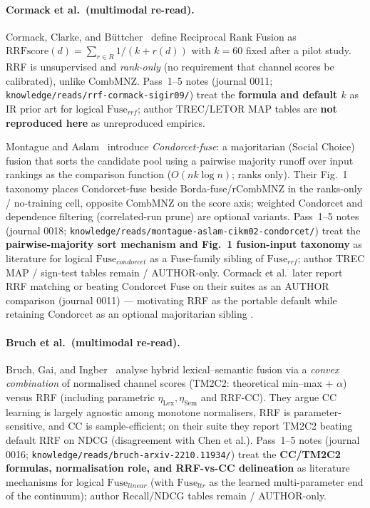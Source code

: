 \paragraph{Cormack et al.\ (multimodal re-read).}
Cormack, Clarke, and B\"{u}ttcher~\citep{cormack2009rrf} define Reciprocal Rank Fusion as
\(\mathrm{RRFscore}(d)=\sum_{r\in R} 1/(k+r(d))\) with \(k=60\) fixed after a pilot study.
RRF is unsupervised and \emph{rank-only} (no requirement that channel scores be calibrated), unlike CombMNZ.
Pass~1--5 notes (journal 0011; \texttt{knowledge/reads/rrf-cormack-sigir09/}) treat the \textbf{formula and default \(k\)} as \established{} IR prior art for logical \(\mathrm{Fuse}_{rrf}\); author TREC/LETOR MAP tables are \textbf{not reproduced here} \provisional{} as unreproduced empirics.

Montague and Aslam~\citep{montague2002condorcet} introduce \emph{Condorcet-fuse}: a majoritarian (Social Choice) fusion that sorts the candidate pool using a pairwise majority runoff over input rankings as the comparison function (\(O(nk\log n)\); ranks only).
Their Fig.~1 taxonomy places Condorcet-fuse beside Borda-fuse/rCombMNZ in the ranks-only / no-training cell, opposite CombMNZ on the score axis; weighted Condorcet and dependence filtering (correlated-run prune) are optional variants.
Pass~1--5 notes (journal 0018; \texttt{knowledge/reads/montague-aslam-cikm02-condorcet/}) treat the \textbf{pairwise-majority sort mechanism and Fig.~1 fusion-input taxonomy} as \established{} literature for logical \(\mathrm{Fuse}_{condorcet}\) as a Fuse-family sibling of \(\mathrm{Fuse}_{rrf}\); author TREC MAP / sign-test tables remain \provisional{} / AUTHOR-only.
Cormack et al.\ later report RRF matching or beating Condorcet Fuse on their suites \established{} as an AUTHOR comparison (journal 0011) --- motivating RRF as the portable default while retaining Condorcet as an optional majoritarian sibling \hypothesis{}.

\paragraph{Bruch et al.\ (multimodal re-read).}
Bruch, Gai, and Ingber~\citep{bruch2023fusion} analyse hybrid lexical--semantic fusion via a \emph{convex combination} of normalised channel scores (TM2C2: theoretical min--max + \(\alpha\)) versus RRF (including parametric \(\eta_{\mathrm{Lex}},\eta_{\mathrm{Sem}}\) and RRF-CC).
They argue CC learning is largely agnostic among monotone normalisers, RRF is parameter-sensitive, and CC is sample-efficient; on their suite they report TM2C2 beating default RRF on NDCG (disagreement with Chen et al.).
Pass~1--5 notes (journal 0016; \texttt{knowledge/reads/bruch-arxiv-2210.11934/}) treat the \textbf{CC/TM2C2 formulas, normalisation role, and RRF-vs-CC delineation} as \established{} literature mechanisms for logical \(\mathrm{Fuse}_{linear}\) (with \(\mathrm{Fuse}_{ltr}\) as the learned multi-parameter end of the continuum); author Recall/NDCG tables remain \provisional{} / AUTHOR-only.

